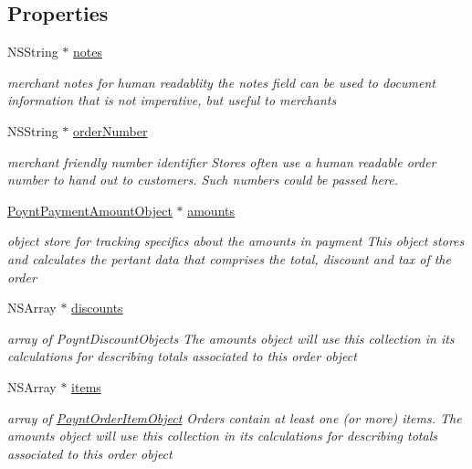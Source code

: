 \subsection*{Properties}
\begin{DoxyCompactItemize}
\item 
N\+S\+String $\ast$ \hyperlink{interface_poynt_order_object_a940861134b75ee3d5167d791e5422afe}{notes}
\begin{DoxyCompactList}\small\item\em merchant notes for human readablity  the notes field can be used to document information that is not imperative, but useful to merchants \end{DoxyCompactList}\item 
N\+S\+String $\ast$ \hyperlink{interface_poynt_order_object_add3af147d846009706270bf6315b1229}{order\+Number}
\begin{DoxyCompactList}\small\item\em merchant friendly number identifier  Stores often use a human readable order number to hand out to customers. Such numbers could be passed here. \end{DoxyCompactList}\item 
\hyperlink{interface_poynt_payment_amount_object}{Poynt\+Payment\+Amount\+Object} $\ast$ \hyperlink{interface_poynt_order_object_a24782f14a239c62d29bf0389fb7fdf8d}{amounts}
\begin{DoxyCompactList}\small\item\em object store for tracking specifics about the amounts in payment  This object stores and calculates the pertant data that comprises the total, discount and tax of the order \end{DoxyCompactList}\item 
N\+S\+Array $\ast$ \hyperlink{interface_poynt_order_object_a203259381417b0a34916ce3f864161c2}{discounts}
\begin{DoxyCompactList}\small\item\em array of Poynt\+Discount\+Objects  The amounts object will use this collection in its calculations for describing totals associated to this order object \end{DoxyCompactList}\item 
N\+S\+Array $\ast$ \hyperlink{interface_poynt_order_object_a79b667618eb44106221f198156b54dd2}{items}
\begin{DoxyCompactList}\small\item\em array of \hyperlink{interface_poynt_order_item_object}{Poynt\+Order\+Item\+Object}  Orders contain at least one (or more) items. The amounts object will use this collection in its calculations for describing totals associated to this order object \end{DoxyCompactList}\item 

\end{DoxyCompactItemize}
